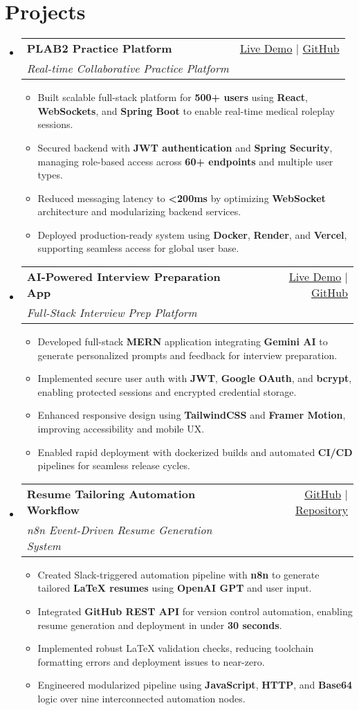 \documentclass[letterpaper,11pt]{article}
\makeatletter
\newcommand{\resumeItem}[1]{\item\small{#1 \vspace{-2pt}}}
\newcommand{\resumeSubheading}[4]{
  \vspace{-1pt}\item
    \begin{tabular*}{0.97\textwidth}[t]{l@{\extracolsep{\fill}}r}
      \textbf{#1} & #2 \\
      \textit{\small#3} & \textit{\small #4} \\
    \end{tabular*}\vspace{-5pt}
}
\newcommand{\resumeSubHeadingListStart}{\begin{itemize}[leftmargin=*]}
\newcommand{\resumeSubHeadingListEnd}{\end{itemize}}
\newcommand{\resumeItemListStart}{\begin{itemize}}
\newcommand{\resumeItemListEnd}{\end{itemize}\vspace{-5pt}}
\makeatother
\begin{document}
\section{Projects}
  \resumeSubHeadingListStart
    \resumeSubheading
      {\textbf{PLAB2 Practice Platform}}{\href{https://plab2practice.com}{Live Demo} | \href{https://github.com/altansaid/plab2projectnew}{GitHub}}
      {Real-time Collaborative Practice Platform}{}
      \resumeItemListStart
        \resumeItem{Built scalable full-stack platform for \textbf{500+ users} using \textbf{React}, \textbf{WebSockets}, and \textbf{Spring Boot} to enable real-time medical roleplay sessions.}
        \resumeItem{Secured backend with \textbf{JWT authentication} and \textbf{Spring Security}, managing role-based access across \textbf{60+ endpoints} and multiple user types.}
        \resumeItem{Reduced messaging latency to \textbf{<200ms} by optimizing \textbf{WebSocket} architecture and modularizing backend services.}
        \resumeItem{Deployed production-ready system using \textbf{Docker}, \textbf{Render}, and \textbf{Vercel}, supporting seamless access for global user base.}
      \resumeItemListEnd

    \resumeSubheading
      {\textbf{AI-Powered Interview Preparation App}}{\href{https://interviewcoach-ai.vercel.app}{Live Demo} | \href{https://github.com/altansaid/interviewcoach-ai}{GitHub}}
      {Full-Stack Interview Prep Platform}{}
      \resumeItemListStart
        \resumeItem{Developed full-stack \textbf{MERN} application integrating \textbf{Gemini AI} to generate personalized prompts and feedback for interview preparation.}
        \resumeItem{Implemented secure user auth with \textbf{JWT}, \textbf{Google OAuth}, and \textbf{bcrypt}, enabling protected sessions and encrypted credential storage.}
        \resumeItem{Enhanced responsive design using \textbf{TailwindCSS} and \textbf{Framer Motion}, improving accessibility and mobile UX.}
        \resumeItem{Enabled rapid deployment with dockerized builds and automated \textbf{CI/CD} pipelines for seamless release cycles.}
      \resumeItemListEnd

    \resumeSubheading
      {\textbf{Resume Tailoring Automation Workflow}}{\href{}{GitHub} | \href{https://github.com/altansaid/resume-updates}{Repository}}
      {n8n Event-Driven Resume Generation System}{}
      \resumeItemListStart
        \resumeItem{Created Slack-triggered automation pipeline with \textbf{n8n} to generate tailored \textbf{LaTeX resumes} using \textbf{OpenAI GPT} and user input.}
        \resumeItem{Integrated \textbf{GitHub REST API} for version control automation, enabling resume generation and deployment in under \textbf{30 seconds}.}
        \resumeItem{Implemented robust LaTeX validation checks, reducing toolchain formatting errors and deployment issues to near-zero.}
        \resumeItem{Engineered modularized pipeline using \textbf{JavaScript}, \textbf{HTTP}, and \textbf{Base64} logic over nine interconnected automation nodes.}
      \resumeItemListEnd
  \resumeSubHeadingListEnd
\end{document}
